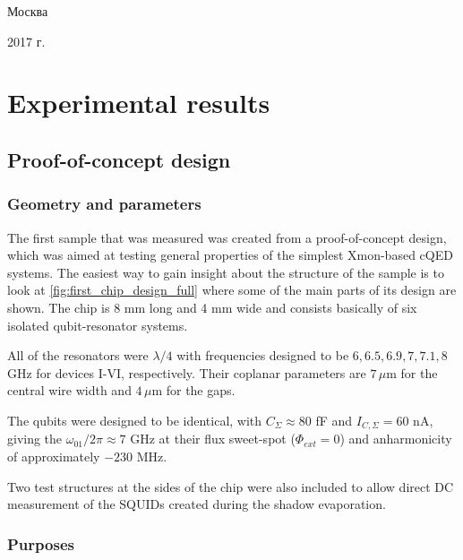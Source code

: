 \documentclass[12pt, twoside]{report}
\numberwithin{equation}{section}
\begin{document}
\begin{titlepage}
\begin{center}
\vfill

Москва

2017 г. 
\end {center} 
\end{titlepage}




\tableofcontents







\chapter{Experimental results}

\section{Proof-of-concept design}

\subsection{Geometry and parameters}

The first sample that was measured was created from a proof-of-concept design, which was aimed at testing general properties of the simplest Xmon-based cQED systems. The easiest way to gain insight about the structure of the sample is to look at \autoref{fig:first_chip_design_full} where some of the main parts of its design are shown. The chip is 8 mm long and 4 mm wide and consists basically of six isolated qubit-resonator systems. 

All of the resonators were $\lambda/4$ with frequencies designed to be $6, 6.5, 6.9,7,7.1,8$ GHz for devices I-VI, respectively. Their coplanar parameters are $7\,\mu$m for the central wire width and $4\,\mu$m for the gaps.

The qubits were designed to be identical, with $C_\Sigma \approx 80$ fF and $I_{C, \Sigma} = 60$ nA, giving the $\omega_{01}/2\pi \approx 7$ GHz at their flux sweet-spot ($\Phi_{ext}=0$) and anharmonicity of approximately $-230$ MHz.

Two test structures at the sides of the chip were also included to allow direct DC measurement of the SQUIDs created during the shadow evaporation.

\subsection{Purposes}
\end{document}
